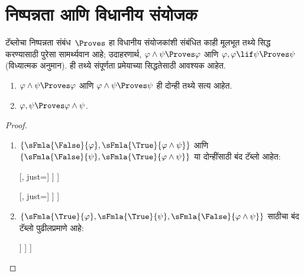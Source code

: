 \section{निष्पन्नता आणि विधानीय संयोजक}\label{fol:tab:ppr:sec}

\begin{explain}
  टॅब्लोचा निष्पन्नता संबंध~$\Proves$ हा विधानीय संयोजकांशी संबंधित
  काही मूलभूत तथ्ये सिद्ध करण्यासाठी पुरेसा सामर्थ्यवान आहे; उदाहरणार्थ,
  $\varphi \land \psi \Proves \varphi$ आणि $\varphi, \varphi \lif \psi \Proves \psi$
  (विध्यात्मक अनुमान). ही तथ्ये संपूर्णता प्रमेयाच्या सिद्धतेसाठी आवश्यक आहेत.
\end{explain}

\begin{prop}\label{fol:tab:ppr:prop:provability-land}
  \begin{enumerate}
  \item \label{fol:tab:ppr:prop:provability-land-left} $\varphi \land \psi \Proves
    \varphi$ आणि $\varphi \land \psi \Proves \psi$ ही दोन्ही तथ्ये सत्य आहेत.
  \item \label{fol:tab:ppr:prop:provability-land-right} $\varphi, \psi \Proves \varphi \land
    \psi$.
  \end{enumerate}
\end{prop}

\begin{proof}
  \begin{enumerate}
  \item $\{\sFmla{\False}{\varphi}, \sFmla{\True}{\varphi \land \psi}\}$ आणि
    $\{\sFmla{\False}{\psi}, \sFmla{\True}{\varphi \land \psi}\}$ या दोन्हींसाठी
    बंद टॅब्लो आहेत:
    \begin{oltableau}{}
      [\sFmla{\False}{\varphi}, just=\TAss
        [\sFmla{\True}{\varphi \land \psi}, just=\TAss
          [\sFmla{\True}{\varphi},just={\TRule{\True}{\land}[2]}
            [\sFmla{\True}{\psi},just={\TRule{\True}{\land}[2]}, close
            ]
          ]
        ]
      ]
    \end{oltableau}
    \begin{oltableau}{}
      [\sFmla{\False}{\psi}, just=\TAss
        [\sFmla{\True}{\varphi \land \psi}, just=\TAss
          [\sFmla{\True}{\varphi},just={\TRule{\True}{\land}[2]}
            [\sFmla{\True}{\psi},just={\TRule{\True}{\land}[2]}, close
            ]
          ]
        ]
      ]
    \end{oltableau}
    \item $\{\sFmla{\True}{\varphi}, \sFmla{\True}{\psi},
      \sFmla{\False}{\varphi \land \psi}\}$ साठीचा बंद टॅब्लो पुढीलप्रमाणे आहे:
      \begin{oltableau}
        [\sFmla{\False}{\varphi \land \psi}, just = \TAss
          [\sFmla{\True}{\varphi}, just = \TAss
            [\sFmla{\True}{\psi}, just=\TAss
              [\sFmla{\False}{\varphi}, just = {\TRule{\False}{\land}[1]}, close]
              [\sFmla{\False}{\psi}, just = {\TRule{\False}{\land}[1]}, close]
            ]
          ]
        ]
      \end{oltableau}
  \end{enumerate}
\end{proof}


